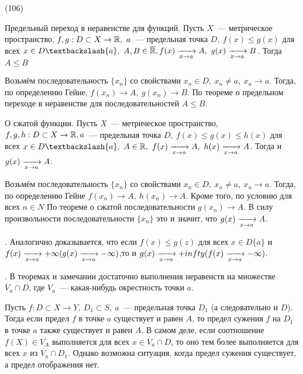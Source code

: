 (106)

\T \q Предельный переход в неравенстве для функций. Пусть $X$~--- метрическое пространство, $f, g: D\subset X\to \mathbb{R},\ a$~--- предельная точка $D,\ f(x)\le g(x)$ для всех $x\in D\bsl \{a\},\ A, B\in \ol{\R}, f(x)\t A,\ g(x)\t B$. Тогда $A \le B$

\D Возьмём последовательность $\{x_n\}$ со свойствами $x_n \in D,\ x_n \neq a,\ x_n\to a$. Тогда, по определению Гейне, $f(x_n) \to A,\ g(x_n)\to B$. По теореме о предельном переходе в неравенстве для последовательностей $A \le B$.

\T \q О сжатой функции. Пусть $X$~--- метрическое пространство, $f, g, h: D\subset X \to \mathbb{R}, a$~--- предельная точка $D,\ f(x)\le g(x)\le h(x)$ для всех $x \in D\bsl\{a\},\ A \in \R,\ f(x)\t A,\ h(x)\t A$. Тогда и $g(x)\xrightarrow[x\to a]{} A$.

\D Возьмём последовательность $\{x_n\}$ со свойствами $x_n \in D,\ x_n \neq a,\ x_n\to a$. Тогда, по определению Гейне $f(x_n) \to A,\ h(x_n) \to A$. Кроме того, по условию для всех $n \in N$  По теореме о сжатой последовательности $g(x_n) \to A$. В силу произвольности последовательности $\{x_n\}$ это и значит, что $g(x)\xrightarrow[x\to a]{} A$.

. Аналогично доказывается, что если $f(x) \le g(z)$ для всех $x \in D\{a\}$ и $f(x) \xrightarrow[x\to a]{} +\infty (g(x)\xrightarrow[x\to a]{} -\infty)$,то и $g(x) \xrightarrow[x\to a]{} +infty (f(x) \xrightarrow[x\to a]{} -\infty)$.

. В теоремах и замечании достаточно выполнения неравенств на множестве $\dot{V_a}\cap D$, где $V_a$~--- какая-нибудь окрестность точки $a$.

Пусть $f: D \subset X\to Y,\ D_1 \subset S,\ a$~--- предельная точка $D_1$ (а следовательно и $D$). Тогда если предел $f$ в точке $a$ существует и равен $A$, то предел сужения $f$ на $D_1$ в точке $a$ также существует и равен $A$. В самом деле, если соотношение $f(X) \in V_A$ выполняется для всех $x \in \dot{V_a}\cap D$, то оно тем более выполняется для всех $x$ из $\dot{V_a}\cap D_1$. Однако возможна ситуация, когда предел сужения существует, а предел отображения нет.